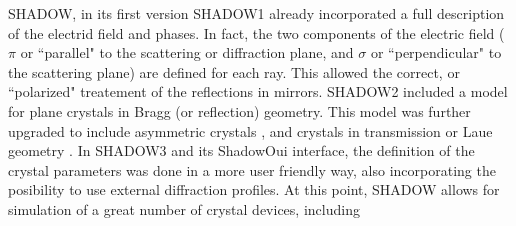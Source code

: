 \documentclass{iucr}
\begin{document}
SHADOW, in its first version SHADOW1 \cite{Cerrina1984} already incorporated a full description of the electrid field and phases.
In fact, the two components of the electric field ($\pi$ or ``parallel" to the scattering or diffraction plane, and $\sigma$ or ``perpendicular" to the scattering plane) are defined for each ray. 
This allowed the correct, or ``polarized" treatement of the reflections in mirrors. SHADOW2 \cite{Lai1988} included a model for plane crystals in Bragg (or reflection) geometry.
This model was further upgraded to include asymmetric crystals \cite{SanchezdelRio1992}, and crystals in transmission or Laue geometry \cite{SanchezdelRio1994}.
In SHADOW3 \cite{codeSHADOW} and its ShadowOui \cite{codeSHADOWOUI} interface, the definition of the crystal parameters was done in a more user friendly way, also incorporating the posibility to use external diffraction profiles.
At this point, SHADOW allows for simulation of a great number of crystal devices, including
\end{document}
